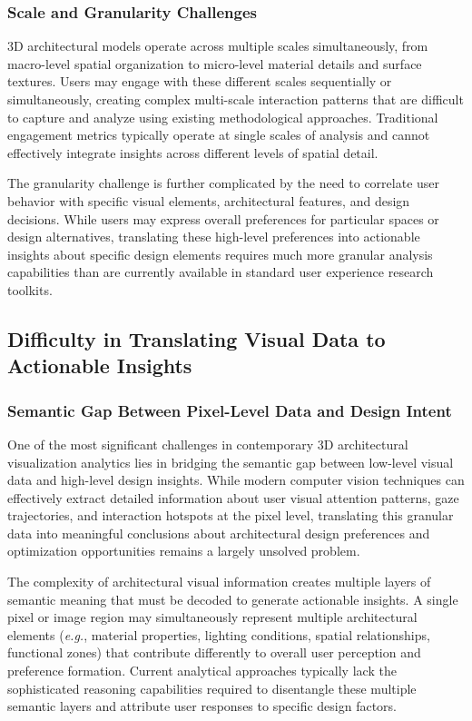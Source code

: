 \documentclass[12pt,a4paper]{book}
\begin{document}
\subsubsection{Scale and Granularity Challenges}
\label{subsubsec:scale_granularity}

3D architectural models operate across multiple scales simultaneously, from macro-level spatial organization to micro-level material details and surface textures. Users may engage with these different scales sequentially or simultaneously, creating complex multi-scale interaction patterns that are difficult to capture and analyze using existing methodological approaches. Traditional engagement metrics typically operate at single scales of analysis and cannot effectively integrate insights across different levels of spatial detail.

The granularity challenge is further complicated by the need to correlate user behavior with specific visual elements, architectural features, and design decisions. While users may express overall preferences for particular spaces or design alternatives, translating these high-level preferences into actionable insights about specific design elements requires much more granular analysis capabilities than are currently available in standard user experience research toolkits.

\subsection{Difficulty in Translating Visual Data to Actionable Insights}
\label{subsec:visual_data_translation}

\subsubsection{Semantic Gap Between Pixel-Level Data and Design Intent}
\label{subsubsec:semantic_gap}

One of the most significant challenges in contemporary 3D architectural visualization analytics lies in bridging the semantic gap between low-level visual data and high-level design insights. While modern computer vision techniques can effectively extract detailed information about user visual attention patterns, gaze trajectories, and interaction hotspots at the pixel level, translating this granular data into meaningful conclusions about architectural design preferences and optimization opportunities remains a largely unsolved problem.

The complexity of architectural visual information creates multiple layers of semantic meaning that must be decoded to generate actionable insights. A single pixel or image region may simultaneously represent multiple architectural elements (\textit{e.g.}, material properties, lighting conditions, spatial relationships, functional zones) that contribute differently to overall user perception and preference formation. Current analytical approaches typically lack the sophisticated reasoning capabilities required to disentangle these multiple semantic layers and attribute user responses to specific design factors.
\end{document}
